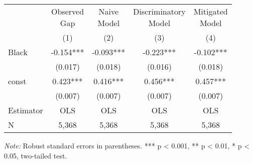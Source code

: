 \begin{tabular}{lcccc}
\toprule
 &  \makecell{Observed \\ Gap} & \makecell{Naive \\ Model} &    \makecell{Discriminatory \\ Model} &   \makecell{Mitigated \\ Model}  \\
\cline{2-5}
{} &        (1) &        (2) &        (3) &         (4) \\
\midrule
Black              &  -0.154*** &  -0.093*** &  -0.223*** &   -0.102*** \\
                   &    (0.017) &    (0.018) &    (0.016) &     (0.018) \\
const              &   0.423*** &   0.416*** &   0.456*** &    0.457*** \\
                   &    (0.007) &    (0.007) &    (0.007) &     (0.007) \\
\midrule
Estimator          &        OLS &        OLS &        OLS &         OLS \\
\midrule
N                  &      5,368 &      5,368 &      5,368 &       5,368 \\
\bottomrule
\end{tabular}

\begin{singlespace} \noindent  \textit{Note:} Robust standard errors in parentheses. *** p < 0.001, ** p < 0.01, * p < 0.05, two-tailed test.\end{singlespace}